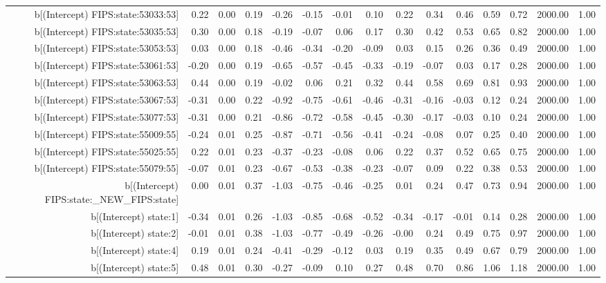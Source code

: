 \begin{table}[ht]
\begin{tabular}{rrrrrrrrrrrrrrr}
  b[(Intercept) FIPS:state:53033:53] & 0.22 & 0.00 & 0.19 & -0.26 & -0.15 & -0.01 & 0.10 & 0.22 & 0.34 & 0.46 & 0.59 & 0.72 & 2000.00 & 1.00 \\ 
  b[(Intercept) FIPS:state:53035:53] & 0.30 & 0.00 & 0.18 & -0.19 & -0.07 & 0.06 & 0.17 & 0.30 & 0.42 & 0.53 & 0.65 & 0.82 & 2000.00 & 1.00 \\ 
  b[(Intercept) FIPS:state:53053:53] & 0.03 & 0.00 & 0.18 & -0.46 & -0.34 & -0.20 & -0.09 & 0.03 & 0.15 & 0.26 & 0.36 & 0.49 & 2000.00 & 1.00 \\ 
  b[(Intercept) FIPS:state:53061:53] & -0.20 & 0.00 & 0.19 & -0.65 & -0.57 & -0.45 & -0.33 & -0.19 & -0.07 & 0.03 & 0.17 & 0.28 & 2000.00 & 1.00 \\ 
  b[(Intercept) FIPS:state:53063:53] & 0.44 & 0.00 & 0.19 & -0.02 & 0.06 & 0.21 & 0.32 & 0.44 & 0.58 & 0.69 & 0.81 & 0.93 & 2000.00 & 1.00 \\ 
  b[(Intercept) FIPS:state:53067:53] & -0.31 & 0.00 & 0.22 & -0.92 & -0.75 & -0.61 & -0.46 & -0.31 & -0.16 & -0.03 & 0.12 & 0.24 & 2000.00 & 1.00 \\ 
  b[(Intercept) FIPS:state:53077:53] & -0.31 & 0.00 & 0.21 & -0.86 & -0.72 & -0.58 & -0.45 & -0.30 & -0.17 & -0.03 & 0.10 & 0.24 & 2000.00 & 1.00 \\ 
  b[(Intercept) FIPS:state:55009:55] & -0.24 & 0.01 & 0.25 & -0.87 & -0.71 & -0.56 & -0.41 & -0.24 & -0.08 & 0.07 & 0.25 & 0.40 & 2000.00 & 1.00 \\ 
  b[(Intercept) FIPS:state:55025:55] & 0.22 & 0.01 & 0.23 & -0.37 & -0.23 & -0.08 & 0.06 & 0.22 & 0.37 & 0.52 & 0.65 & 0.75 & 2000.00 & 1.00 \\ 
  b[(Intercept) FIPS:state:55079:55] & -0.07 & 0.01 & 0.23 & -0.67 & -0.53 & -0.38 & -0.23 & -0.07 & 0.09 & 0.22 & 0.38 & 0.53 & 2000.00 & 1.00 \\ 
  b[(Intercept) FIPS:state:\_NEW\_FIPS:state] & 0.00 & 0.01 & 0.37 & -1.03 & -0.75 & -0.46 & -0.25 & 0.01 & 0.24 & 0.47 & 0.73 & 0.94 & 2000.00 & 1.00 \\ 
  b[(Intercept) state:1] & -0.34 & 0.01 & 0.26 & -1.03 & -0.85 & -0.68 & -0.52 & -0.34 & -0.17 & -0.01 & 0.14 & 0.28 & 2000.00 & 1.00 \\ 
  b[(Intercept) state:2] & -0.01 & 0.01 & 0.38 & -1.03 & -0.77 & -0.49 & -0.26 & -0.00 & 0.24 & 0.49 & 0.75 & 0.97 & 2000.00 & 1.00 \\ 
  b[(Intercept) state:4] & 0.19 & 0.01 & 0.24 & -0.41 & -0.29 & -0.12 & 0.03 & 0.19 & 0.35 & 0.49 & 0.67 & 0.79 & 2000.00 & 1.00 \\ 
  b[(Intercept) state:5] & 0.48 & 0.01 & 0.30 & -0.27 & -0.09 & 0.10 & 0.27 & 0.48 & 0.70 & 0.86 & 1.06 & 1.18 & 2000.00 & 1.00 \\ 

\end{tabular}
\end{table}
